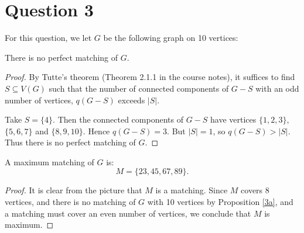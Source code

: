 \documentclass{unswmaths}
\begin{document}
\section{Question 3}
For this question, we let $G$ be the following graph on 10 vertices:
\begin{center}
\end{center}
\begin{proposition}
\label{3a}
    There is no perfect matching of $G$.
\end{proposition}
\begin{proof}
    By Tutte's theorem (Theorem 2.1.1 in the course notes), it suffices to find
    $S \subseteq V(G)$ such that the number of connected components of $G-S$ with
    an odd number of vertices, $q(G-S)$
    exceeds $|S|$.
    
    Take $S = \{4\}$. Then the connected components of $G-S$ have vertices $\{1,2,3\}$,
    $\{5,6,7\}$ and $\{8,9,10\}$. Hence $q(G-S) = 3$. But $|S| = 1$, so $q(G-S) > |S|$.
    Thus there is no perfect matching of $G$.
\end{proof}
\begin{proposition}
\label{3b}
    A maximum matching of $G$ is:
    \begin{equation}
        M = \{ 23,45,67,89\}.
    \end{equation}
\end{proposition}
\begin{proof}
    It is clear from the picture that $M$ is a matching. Since $M$ covers $8$
    vertices, and there is no matching of $G$ with 10 vertices by Proposition \ref{3a}, 
    and a matching must cover an even number of vertices, we conclude that 
    $M$ is maximum.
\end{proof} 
\end{document}
